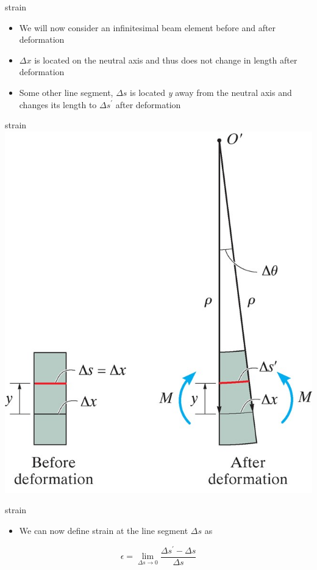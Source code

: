 \begin{frame}{strain}
\protect\hypertarget{strain}{}
\begin{itemize}
\tightlist
\item
  We will now consider an infinitesimal beam element before and after
  deformation
\item
  \(\Delta x\) is located on the neutral axis and thus does not change
  in length after deformation
\item
  Some other line segment, \(\Delta s\) is located \emph{y} away from
  the neutral axis and changes its length to \(\Delta s ^\prime\) after
  deformation
\end{itemize}
\end{frame}

\begin{frame}{strain}
\protect\hypertarget{strain-1}{}
\includegraphics{../images/beam-element.jpg}
\end{frame}

\begin{frame}{strain}
\protect\hypertarget{strain-2}{}
\begin{itemize}
\tightlist
\item
  We can now define strain at the line segment \(\Delta s\) as
\end{itemize}

\[\epsilon = \lim_{\Delta s \to 0} \frac{\Delta s^\prime - \Delta s}{\Delta s}\]
\end{frame}

